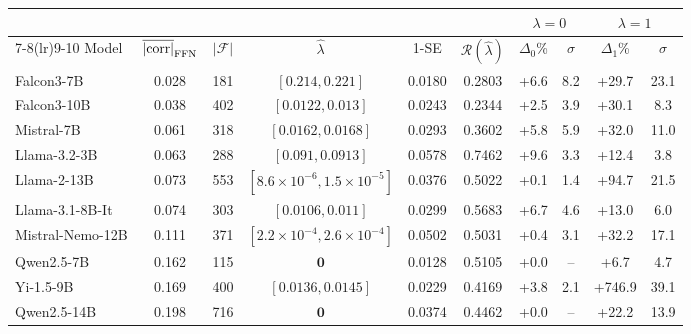 \footnotesize\setlength{\tabcolsep}{3pt}\renewcommand{\arraystretch}{1.02}
\begin{tabular}{l c c c c c cc cc}
\toprule
& & & & & & \multicolumn{2}{c}{$\lambda{=}0$} & \multicolumn{2}{c}{$\lambda{=}1$}\\
\cmidrule(lr){7-8}\cmidrule(lr){9-10}
Model & $\overline{|{\rm corr}|}_{\rm FFN}$ & $|\mathcal{F}|$ & $\hat\lambda$ & 1-SE
& $\mathcal{R}(\hat\lambda)$ & $\Delta_0$\% & $\sigma$ & $\Delta_1$\% & $\sigma$\\
\midrule
Falcon3-7B & 0.028 & 181 & $[0.214,0.221]$ & 0.0180 & 0.2803 & +6.6 & 8.2 & +29.7 & 23.1\\
Falcon3-10B & 0.038 & 402 & $[0.0122,0.013]$ & 0.0243 & 0.2344 & +2.5 & 3.9 & +30.1 & 8.3\\
Mistral-7B & 0.061 & 318 & $[0.0162,0.0168]$ & 0.0293 & 0.3602 & +5.8 & 5.9 & +32.0 & 11.0\\
Llama-3.2-3B & 0.063 & 288 & $[0.091,0.0913]$ & 0.0578 & 0.7462 & +9.6 & 3.3 & +12.4 & 3.8\\
Llama-2-13B & 0.073 & 553 & $[8.6\!\times\!10^{-6},1.5\!\times\!10^{-5}]$ & 0.0376 & 0.5022 & +0.1 & 1.4 & +94.7 & 21.5\\
Llama-3.1-8B-It & 0.074 & 303 & $[0.0106,0.011]$ & 0.0299 & 0.5683 & +6.7 & 4.6 & +13.0 & 6.0\\
Mistral-Nemo-12B & 0.111 & 371 & $[2.2\!\times\!10^{-4},2.6\!\times\!10^{-4}]$ & 0.0502 & 0.5031 & +0.4 & 3.1 & +32.2 & 17.1\\
Qwen2.5-7B & 0.162 & 115 & $\mathbf{0}$ & 0.0128 & 0.5105 & +0.0 & -- & +6.7 & 4.7\\
Yi-1.5-9B & 0.169 & 400 & $[0.0136,0.0145]$ & 0.0229 & 0.4169 & +3.8 & 2.1 & +746.9 & 39.1\\
Qwen2.5-14B & 0.198 & 716 & $\mathbf{0}$ & 0.0374 & 0.4462 & +0.0 & -- & +22.2 & 13.9\\
\bottomrule
\end{tabular}
